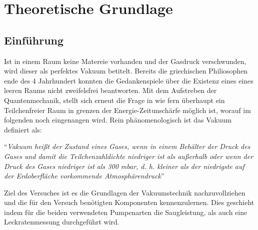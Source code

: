 \section{Theoretische Grundlage}
\label{sec:Theorie}

\subsection{Einführung}
Ist in einem Raum keine Matereie vorhanden und der Gasdruck verschwunden, wird dieser als perfektes Vakuum betitelt. Bereits die griechischen Philiosophen ende des 4 Jahrhundert konnten die Gedankenspiele über die Existenz eines eines leeren Raums nicht zweifelsfrei beantworten. Mit dem Aufstreben der Quantenmechanik, stellt sich erneut die Frage in wie fern überhaupt ein Teilchenfreier Raum in grenzen der Energie-Zeitunschärfe möglich ist, worauf im folgenden noch eingenangen wird. Rein phänomenologisch ist das Vakuum definiert als:

``\textit{Vakuum heißt der Zustand eines Gases, wenn in einem Behälter der Druck des Gases und damit die Teilchenzahldichte niedriger ist als außerhalb oder wenn der Druck des Gases niedriger ist als 300 mbar, d. h. kleiner als der niedrigste auf der Erdoberfläche vorkommende Atmosphärendruck}'' \cite{DIN}

Ziel des Versuches ist es die Grundlagen der Vakuumstechnik nachzuvollziehen und die für den Versuch benötigten Komponenten kennenzulernen. Dies geschieht indem für die beiden verwendeten Pumpenarten die Saugleistung, als auch eine Leckratenmessung durchgeführt wird.


